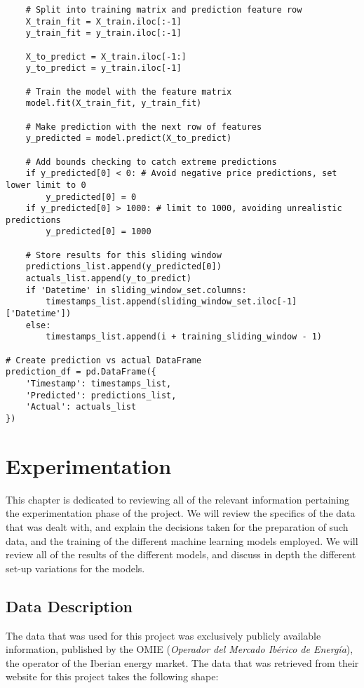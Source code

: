 \documentclass[12pt]{report} %
\begin{document}
\begin{lstlisting}
    # Split into training matrix and prediction feature row
    X_train_fit = X_train.iloc[:-1]
    y_train_fit = y_train.iloc[:-1]

    X_to_predict = X_train.iloc[-1:]
    y_to_predict = y_train.iloc[-1]

    # Train the model with the feature matrix
    model.fit(X_train_fit, y_train_fit)

    # Make prediction with the next row of features
    y_predicted = model.predict(X_to_predict)

    # Add bounds checking to catch extreme predictions
    if y_predicted[0] < 0: # Avoid negative price predictions, set lower limit to 0
        y_predicted[0] = 0
    if y_predicted[0] > 1000: # limit to 1000, avoiding unrealistic predictions
        y_predicted[0] = 1000

    # Store results for this sliding window
    predictions_list.append(y_predicted[0])
    actuals_list.append(y_to_predict)
    if 'Datetime' in sliding_window_set.columns:
        timestamps_list.append(sliding_window_set.iloc[-1]['Datetime'])
    else:
        timestamps_list.append(i + training_sliding_window - 1)

# Create prediction vs actual DataFrame
prediction_df = pd.DataFrame({
    'Timestamp': timestamps_list,
    'Predicted': predictions_list,
    'Actual': actuals_list
})
\end{lstlisting}



\chapter{Experimentation}
This chapter is dedicated to reviewing all of the relevant information pertaining the experimentation phase of the project. We will review the specifics of the data that was dealt with, and explain the decisions taken for the preparation of such data, and the training of the different machine learning models employed. We will review all of the results of the different models, and discuss in depth the different set-up variations for the models.


\section{Data Description} %
The data that was used for this project was exclusively publicly available information, published by the OMIE (\textit{Operador del Mercado Ibérico de Energía}), the operator of the Iberian energy market. The data that was retrieved from their website \cite{omie_datos} for this project takes the following shape:
\end{document}
